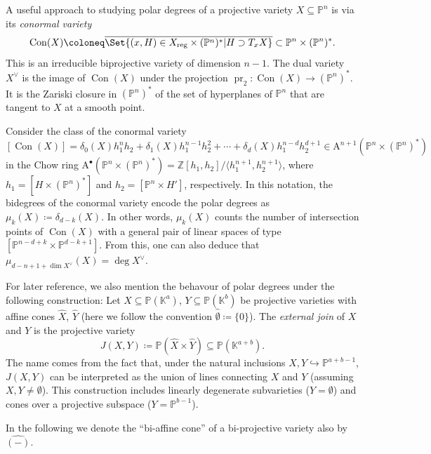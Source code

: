 \documentclass[12pt,a4paper,english]{scrartcl}
\newcommand{\ZZ}{\mathbb{Z}}
\newcommand{\KK}{\mathbb{K}}
\newcommand{\PP}{\mathbb{P}}
\newcommand{\reg}{\mathrm{reg}}
\DeclareMathOperator{\Con}{Con}
\newcommand{\ChowGrp}{\mathrm{A}}
\begin{document}
A useful approach to studying polar degrees of a projective variety $X \subseteq \PP^n$ is via its \emph{conormal variety}
\[
\Con(X) \coloneq \overline{\Set{(x,H) \in X_\reg \times (\PP^n)^* | H \supset T_{x}X }} \subset \PP^n \times (\PP^n)^*.
\]
This is an irreducible biprojective variety of dimension $n-1$.
The dual variety $X^\vee$ is the image of $\Con(X)$ under the projection $\operatorname{pr}_2 \colon \Con(X) \rightarrow (\PP^n)^*$.
It is the Zariski closure in $(\PP^n)^*$ of the set of hyperplanes of $\PP^n$ that are tangent to $X$ at a smooth point.

Consider the class of the conormal variety
\[
[\Con(X)] = 
\delta_0(X) h_1^{n}h_2 + \delta_1(X) h_1^{n-1}h_2^2 + \cdots + \delta_d(X) h_1^{n-d}h_2^{d+1} 
\in \ChowGrp^{n+1}(\PP^n \times (\PP^n)^*)
\]
in the Chow ring $\ChowGrp^\bullet(\PP^n \times (\PP^n)^*) = \ZZ[h_1,h_2]/\langle h_1^{n+1}, h_2^{n+1} \rangle$, where  $h_1 = [H \times (\PP^n)^*]$ and $h_2 = [\PP^n \times H']$, respectively.
In this notation, the bidegrees of the conormal variety encode the polar degrees as $\mu_k(X) \coloneq \delta_{d-k}(X)$. In other words, $\mu_{k}(X)$ counts the number of intersection points of $\Con(X)$ with a general pair of linear spaces  of type $[\PP^{n-d+k} \times \PP^{d-k+1}]$. From this, one can also deduce that $\mu_{d-n+1+\dim X^\vee}(X) = \deg X^\vee$.

For later reference, we also mention the behavour of polar degrees under the following construction: Let $X \subseteq \PP(\KK^a)$, $Y \subseteq \PP(\KK^b)$ be projective varieties with affine cones $\widehat{X}$, $\widehat{Y}$ (here we follow the convention $\widehat{\emptyset} \coloneq \{0\}$). The \emph{external join} of $X$ and $Y$ is the projective variety
\[
J(X,Y) \coloneq \PP(\widehat{X}\times \widehat{Y}) \subseteq \PP(\KK^{a+b}).
\]
The name comes from the fact that, under the natural inclusions $X,Y \hookrightarrow \PP^{a+b-1}$, $J(X,Y)$ can be interpreted as the union of lines connecting $X$ and $Y$ (assuming $X,Y\neq \emptyset$). This construction includes linearly degenerate subvarieties ($Y = \emptyset$) and cones over a projective subspace ($Y=\PP^{b-1}$).

In the following we denote the \enquote{bi-affine cone} of a bi-projective variety also by $\widehat{(-)}$.
\end{document}

